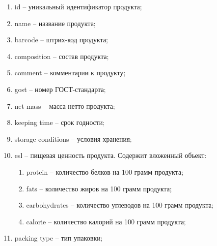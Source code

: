 \begin{enumerate}
	\item id -- уникальный идентификатор продукта;
	\item name -- название продукта;
	\item barcode -- штрих-код продукта;
	\item composition -- состав продукта;
	\item comment -- комментарии к продукту;
	\item gost -- номер ГОСТ-стандарта;
	\item net mass -- масса-нетто продукта;
	\item keeping time -- срок годности;
	\item storage conditions -- условия хранения;
	\item esl -- пищевая ценность продукта. Содержит вложенный объект:
	\begin{enumerate}
		\item protein -- количество белков на 100 грамм продукта;
		\item fats -- количество жиров на 100 грамм продукта;
		\item carbohydrates -- количество углеводов на 100 грамм продукта;
		\item calorie -- количество калорий на 100 грамм продукта;
	\end{enumerate}
	\item packing type -- тип упаковки;
\end{enumerate}